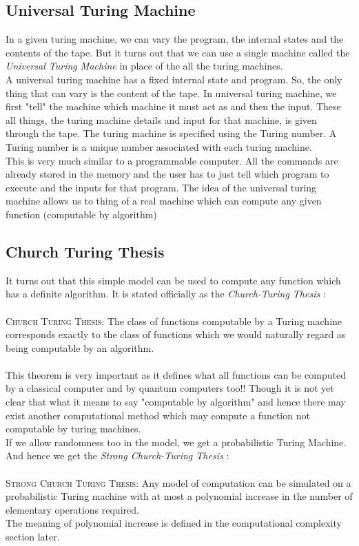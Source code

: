 \subsection{Universal Turing Machine}
In a given turing machine, we can vary the program, the internal states and the contents of the tape. But it turns out that we can use a single machine called the {\it Universal Turing Machine} in place of the all the turing machines.\\
A universal turing machine has a fixed internal state and program. So, the only thing that can vary is the content of the tape. In universal turing machine, we first "tell" the machine which machine it must act as and then the input. These all things, the turing machine details and input for that machine, is given through the tape. The turing machine is specified using the Turing number. A Turing number is a unique number associated with each turing machine.\\
This is very much similar to a programmable computer. All the commands are already stored in the memory and the user has to just tell which program to execute and the inputs for that program. The idea of the universal turing machine allows us to thing of a real machine which can compute any given function (computable by algorithm) \\

\subsection{Church Turing Thesis}
It turns out that this simple model can be used to compute any function which has a definite algorithm. It is stated officially as the{ \it Church-Turing Thesis} :\\
\\{\scshape Church Turing Thesis: } The class of functions computable by a Turing machine corresponds exactly to the class of functions which we would naturally regard as being computable by an algorithm.\\
\\This theorem is very important as it defines what all functions can be computed by a classical computer and by quantum computers too!! Though it is not yet clear that what it means to say "computable by algorithm" and hence there may exist another computational method which may compute a function not computable by turing machines.\\
If we allow randomness too in the model, we get a probabilistic Turing Machine. And hence we get the { \it Strong Church-Turing Thesis} :\\
\\{\scshape Strong Church Turing Thesis: } Any model of computation can be simulated on a probabilistic Turing machine with at most a polynomial increase in the number of elementary operations required.\\
The meaning of polynomial increase is defined in the computational complexity section later.

